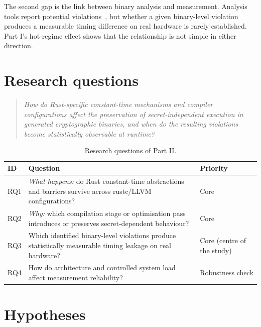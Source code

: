 The second gap is the link between binary analysis and measurement. Analysis tools report potential violations~\cite{ctgrind,microwalk,autobenchct}, but whether a given binary-level violation produces a measurable timing difference on real hardware is rarely established. Part I's hot-regime effect shows that the relationship is not simple in either direction.

\section{Research questions}

\begin{quote}
\itshape How do Rust-specific constant-time mechanisms and compiler configurations affect the preservation of secret-independent execution in generated cryptographic binaries, and when do the resulting violations become statistically observable at runtime?
\end{quote}

\begin{table}[htbp]
\centering
\small
\renewcommand{\arraystretch}{1.18}
\begin{tabular}{@{}P{0.08\textwidth}P{0.66\textwidth}P{0.16\textwidth}@{}}
\toprule
ID & Question & Priority \\
\midrule
RQ1 & \emph{What happens:} do Rust constant-time abstractions and barriers survive across rustc/LLVM configurations? & Core \\
RQ2 & \emph{Why:} which compilation stage or optimisation pass introduces or preserves secret-dependent behaviour? & Core \\
RQ3 & Which identified binary-level violations produce statistically measurable timing leakage on real hardware? & Core (centre of the study) \\
RQ4 & How do architecture and controlled system load affect measurement reliability? & Robustness check \\
\bottomrule
\end{tabular}
\caption{Research questions of Part II.}
\label{tab:rqs}
\end{table}

\section{Hypotheses}

